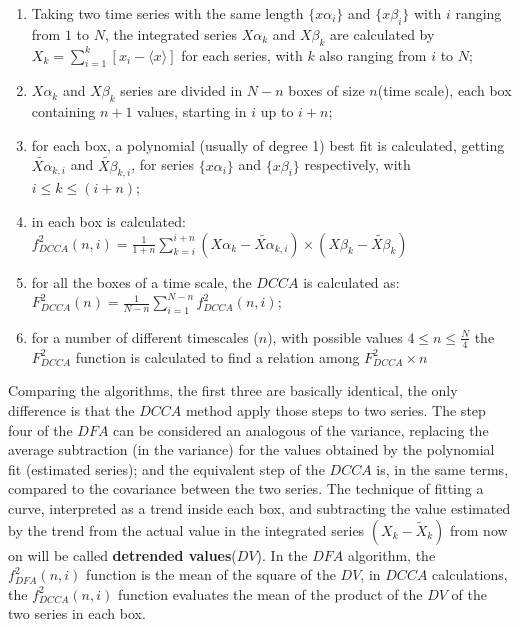 \documentclass[article]{jss}
\begin{document}
\begin{enumerate}
  \label{steps:DCCA}
  \item Taking two time series with the same length $\{x\alpha_{i}\}$ and $\{x\beta_{i}\}$ with $i$ ranging from $1$ to $N$,
        the integrated series $X\alpha_{k}$ and $X\beta_{k}$ are calculated by
        $X_{k} = \sum_{i=1}^{k}\left[x_{i} - \langle x \rangle \right] $ for each series, with $k$ also ranging from $i$ to $N$;
  \item $X\alpha_{k}$ and $X\beta_{k}$ series are divided in $N - n$ boxes of size $n$(time scale), each box containing $n + 1$ values, starting in $i$ up to $i + n$;
  \item for each box, a polynomial (usually of degree 1) best fit is calculated, getting
        $\widetilde{X\alpha}_{k, i}$ and $\widetilde{X\beta}_{k, i}$,
        for series $\{x\alpha_{i}\}$ and $\{x\beta_{i}\}$ respectively,
        with $i \le k \le (i + n)$;
  \item in each box is calculated: $f_{DCCA}^{2}(n, i) =
          \frac{1}{1+n} \sum_{k=i}^{i + n}(X\alpha_{k}-\widetilde{X\alpha}_{k, i}) \times (X\beta_{k}-\widetilde{X\beta}_{k})$
  \item for all the boxes of a time scale, the $DCCA$ is calculated as:\\[10pt]
        $F_{DCCA}^{2}(n) =\frac{1}{N - n} \sum_{i=1}^{N-n} f_{DCCA}^{2}(n, i)$;
  \item for a number of different timescales ($n$), with possible values
        $4 \le n \le \frac{N}{4}$ the $F_{DCCA}^{2}$ function is calculated to find a relation among
        $F_{DCCA}^{2} \times n$
\end{enumerate}

Comparing the algorithms, the first three are basically identical, the only difference is that the $DCCA$ method apply those steps to two series. The step four of the $DFA$ can be considered an analogous of the variance, replacing the average subtraction (in the variance) for the values obtained by the polynomial fit (estimated series); and the equivalent step of the $DCCA$ is, in the same terms, compared to the covariance between the two series. The technique of fitting a curve, interpreted as a trend inside each box, and subtracting the value estimated by the trend from the actual value in the integrated series $(X_{k}-\widetilde{X}_{k})$ from now on will be called \textbf{detrended values}($DV$). In the $DFA$ algorithm, the $f_{DFA}^{2}(n, i)$ function is the mean of the square of the $DV$, in $DCCA$ calculations, the $f_{DCCA}^{2}(n, i)$ function evaluates the mean of the product of the $DV$ of the two series in each box.
\end{document}

